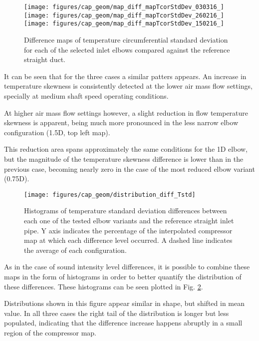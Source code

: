 \begin{figure}[h!]
\centering
\texttt{[image: figures/cap\_geom/map\_diff\_mapTcorStdDev\_030316\_]}\hspace{4mm}
\texttt{[image: figures/cap\_geom/map\_diff\_mapTcorStdDev\_260216\_]}\\[3mm]
\texttt{[image: figures/cap\_geom/map\_diff\_mapTcorStdDev\_150216\_]}\hspace{4mm}
\caption{Difference maps of temperature circumferential standard deviation for each of the selected inlet elbows compared against the reference straight duct.}
\label{fig:map_diff_std}
\end{figure}

It can be seen that for the three cases a similar patters appears. An increase in temperature skewness is consistently detected at the lower air mass flow settings, specially at medium shaft speed operating conditions.

At higher air mass flow settings however, a slight reduction in flow temperature skewness is apparent, being much more pronounced in the less narrow elbow configuration (1.5D, top left map). 

This reduction area spans approximately the same conditions for the 1D elbow, but the magnitude of the temperature skewness difference is lower than in the previous case, becoming nearly zero in the case of the most reduced elbow variant (0.75D).

\begin{figure}[h!]
\centering
\texttt{[image: figures/cap\_geom/distribution\_diff\_Tstd]}
\caption{Histograms of temperature standard deviation differences between each one of the tested elbow variants and the reference straight inlet pipe. Y axis indicates the percentage of the interpolated compressor map at which each difference level occurred. A dashed line indicates the average of each configuration.}
\label{fig:distribution_diff_std}
\end{figure}

As in the case of sound intensity level differences, it is possible to combine these maps in the form of histograms in order to better quantify the distribution of these differences. These histograms can be seen plotted in Fig. \ref{fig:distribution_diff_std}.

Distributions shown in this figure appear similar in shape, but shifted in mean value. In all three cases the right tail of the distribution is longer but less populated, indicating that the difference increase happens abruptly in a small region of the compressor map. 

